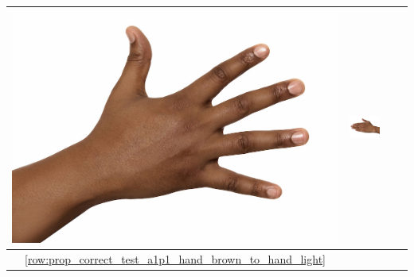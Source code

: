 \begin{longtable}{|c||c|c|c|}
\begin{minipage}{.29\textwidth}
    \includegraphics[width=\textwidth,height=\textheight,keepaspectratio]{../inputs/hand_dark.jpg}
  \end{minipage} & 
  \begin{minipage}{.29\textwidth}
    \includegraphics[width=\textwidth,height=\textheight,keepaspectratio]{../rc_test/outputs/20170522_proportional_corrected_test_alpha1p1/hand_brown_to_hand_dark.jpg}
  \end{minipage} \\
\hline  \ref{row:prop_correct_test_a1p1_hand_brown_to_hand_light} &
  \begin{minipage}{.29\textwidth}

\end{minipage}
\end{longtable}

